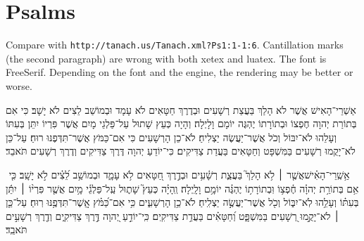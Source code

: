\documentclass{article}
\begin{document}
\section{Psalms}


Compare with \texttt{http://tanach.us/Tanach.xml?Ps1:1-1:6}.
Cantillation marks (the second paragraph) are wrong with both
\textsf{xetex} and \textsf{luatex}. The font is FreeSerif. Depending on
the font and the engine, the rendering may be better or worse.

\bigskip


אַשְׁרֵי־הָאִישׁ אֲשֶׁר לֹא הָלַךְ בַּעֲצַת רְשָׁעִים וּבְדֶרֶךְ
חַטָּאִים לֹא עָמָד וּבְמוֹשַׁב לֵצִים לֹא יָשָׁב׃ כִּי אִם בְּתוֹרַת
יְהוָה חֶפְצוֹ וּבְתוֹרָתוֹ יֶהְגֶּה יוֹמָם וָלָיְלָה׃ וְהָיָה כְּעֵץ
שָׁתוּל עַל־פַּלְגֵי מָיִם אֲשֶׁר פִּרְיוֹ יִתֵּן בְּעִתּוֹ וְעָלֵהוּ
לֹא־יִבּוֹל וְכֹל אֲשֶׁר־יַעֲשֶׂה יַצְלִיחַ׃ לֹא־כֵן הָרְשָׁעִים כִּי
אִם־כַּמֹּץ אֲשֶׁר־תִּדְּפֶנּוּ רוּחַ׃ עַל־כֵּן לֹא־יָקֻמוּ רְשָׁעִים
בַּמִּשְׁפָּט וְחַטָּאִים בַּעֲדַת צַדִּיקִים׃ כִּי־יוֹדֵעַ יְהוָה
דֶּרֶךְ צַדִּיקִים וְדֶרֶךְ רְשָׁעִים תֹּאבֵד׃

אַ֥שְֽׁרֵי־הָאִ֗ישׁ‪ אֲשֶׁ֤ר ׀ לֹ֥א הָלַךְ֮ בַּעֲצַ֪ת רְשָׁ֫עִ֥ים
וּבְדֶ֣רֶךְ חַ֭טָּאִים לֹ֥א עָמָ֑ד וּבְמוֹשַׁ֥ב לֵ֝צִ֗ים לֹ֣א יָשָֽׁב׃
כִּ֤י אִ֥ם בְּתוֹרַ֥ת יְהוָ֗ה חֶ֫פְצ֥וֹ וּֽבְתוֹרָת֥וֹ יֶהְגֶּ֗ה
יוֹמָ֥ם וָלָֽיְלָה׃ וְֽהָיָ֗ה כְּעֵץ֮ שָׁת֪וּל עַֽל־פַּלְגֵ֫י מָ֥יִם
אֲשֶׁ֤ר פִּרְי֨וֹ ׀ יִתֵּ֬ן בְּעִתּ֗וֹ וְעָלֵ֥הוּ לֹֽא־יִבּ֑וֹל וְכֹ֖ל
אֲשֶׁר־יַעֲשֶׂ֣ה יַצְלִֽיחַ׃ לֹא־כֵ֥ן הָרְשָׁעִ֑ים כִּ֥י אִם־כַּ֝מֹּ֗ץ
אֲ‍ֽשֶׁר־תִּדְּפֶ֥נּוּ רֽוּחַ׃ עַל־כֵּ֤ן ׀ לֹא־יָקֻ֣מוּ רְ֭שָׁעִים
בַּמִּשְׁפָּ֑ט וְ֝חַטָּאִ֗ים בַּעֲדַ֥ת צַדִּיקִֽים׃ כִּֽי־יוֹדֵ֣עַ
יְ֭הוָה דֶּ֣רֶךְ צַדִּיקִ֑ים וְדֶ֖רֶךְ רְשָׁעִ֣ים תֹּאבֵֽד׃
\end{document}
